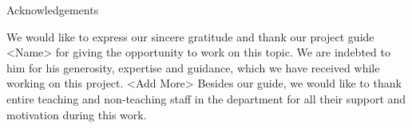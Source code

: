 \newpage
\thispagestyle{empty}

\begin{center}
\LARGE Acknowledgements\\[2.5cm]
\end{center}
We would like to express our sincere gratitude and thank our project guide <Name> for giving the opportunity to work on this topic. We are indebted to him for his generosity, expertise and guidance, which we have received while working on this project. 
<Add More> 
Besides our guide, we would like to thank entire teaching and non-teaching staff in the department for all their support and motivation during this work.

\vfill
\clearpage
